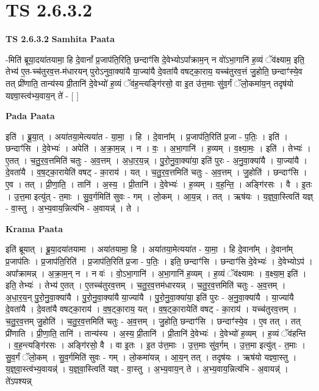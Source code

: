 \documentclass[17pt]{extarticle}
\begin{document}
\section*{ TS 2.6.3.2 }

\textbf{TS 2.6.3.2 } \newline
\textbf{Samhita Paata} \newline

-मिति॑ ब्रूया॒दया॑तयामा॒ हि दे॒वानां᳚ प्र॒जाप॑ति॒रिति॒ छन्दाꣳ॑सि दे॒वेभ्योऽपा᳚क्राम॒न् न वो॑ऽभा॒गानि॑ ह॒व्यं ॅव॑क्ष्याम॒ इति॒ तेभ्य॑ ए॒त-च्च॑तुरव॒त्त-म॑धारयन् पुरोऽनुवा॒क्या॑यै या॒ज्या॑यै दे॒वता॑यै वषट्का॒राय॒ यच्च॑तुरव॒त्तं जु॒होति॒ छन्दाꣳ॑स्ये॒व तत् प्री॑णाति॒ तान्य॑स्य प्री॒तानि॑ दे॒वेभ्यो॑ ह॒व्यं ॅव॑ह॒न्त्यङ्गि॑रसो॒ वा इ॒त उ॑त्त॒माः सु॑व॒र्गं ॅलो॒कमा॑य॒न् तदृष॑यो यज्ञ्वा॒स्त्व॑भ्य॒वाय॒न् ते॑ - [  ] \newline

\textbf{Pada Paata} \newline

इति॑ । ब्रू॒या॒त् । अया॑तया॒मेत्यया॑त - या॒मा॒ । हि । दे॒वाना᳚म् । प्र॒जाप॑ति॒रिति॑ प्र॒जा - प॒तिः॒ । इति॑ । छन्दाꣳ॑सि । दे॒वेभ्यः॑ । अपेति॑ । अ॒क्रा॒म॒न्न् । न । वः॒ । अ॒भा॒गानि॑ । ह॒व्यम् । व॒क्ष्या॒मः॒ । इति॑ । तेभ्यः॑ । ए॒तत् । च॒तु॒र॒व॒त्तमिति॑ चतुः - अ॒व॒त्तम् । अ॒धा॒र॒य॒न्न् । पु॒रो॒नु॒वा॒क्या॑या॒ इति॑ पुरः - अ॒नु॒वा॒क्या॑यै । या॒ज्या॑यै । दे॒वता॑यै । व॒ष॒ट्का॒रायेति॑ वषट् - का॒राय॑ । यत् । च॒तु॒र॒व॒त्तमिति॑ चतुः - अ॒व॒त्तम् । जु॒होति॑ । छन्दाꣳ॑सि । ए॒व । तत् । प्री॒णा॒ति॒ । तानि॑ । अ॒स्य॒ । प्री॒तानि॑ । दे॒वेभ्यः॑ । ह॒व्यम् । व॒ह॒न्ति॒ । अङ्गि॑रसः । वै । इ॒तः । उ॒त्त॒मा इत्यु॑त् - त॒माः । सु॒व॒र्गमिति॑ सुवः - गम् । लो॒कम् । आ॒य॒न्न् । तत् । ऋष॑यः । य॒ज्ञ्॒वा॒स्त्विति॑ यज्ञ् - वा॒स्तु । अ॒भ्य॒वाय॒न्नित्य॑भि - अ॒वायन्न्॑ । ते ।  \newline


\textbf{Krama Paata} \newline

इति॑ ब्रूयात् । ब्रू॒या॒दया॑तयामा । अया॑तयामा॒ हि । अया॑तया॒मेत्यया॑त - या॒मा॒ । हि दे॒वाना᳚म् । दे॒वाना᳚म् प्र॒जाप॑तिः । प्र॒जाप॑ति॒रिति॑ । प्र॒जाप॑ति॒रिति॑ प्र॒जा - प॒तिः॒ । इति॒ छन्दाꣳ॑सि । छन्दाꣳ॑सि दे॒वेभ्यः॑ । दे॒वेभ्योऽप॑ । अपा᳚क्रामन्न् । अ॒क्रा॒म॒न् न । न वः॑ । वो॒ऽभा॒गानि॑ । अ॒भा॒गानि॑ ह॒व्यम् । ह॒व्यं ॅव॑क्ष्यामः । व॒क्ष्या॒म॒ इति॑ । इति॒ तेभ्यः॑ । तेभ्य॑ ए॒तत् । ए॒तच्च॑तुरव॒त्तम् । च॒तु॒र॒व॒त्तम॑धारयन्न् । च॒तु॒र॒व॒त्तमिति॑ चतुः - अ॒व॒त्तम् । अ॒धा॒र॒य॒न् पु॒रो॒नु॒वा॒क्या॑यै । पु॒रो॒नु॒वा॒क्या॑यै या॒ज्या॑यै । पु॒रो॒नु॒वा॒क्या॑या॒ इति॑ पुरः - अ॒नु॒वा॒क्या॑यै । या॒ज्या॑यै दे॒वता॑यै । दे॒वता॑यै वषट्का॒राय॑ । व॒ष॒ट्का॒राय॒ यत् । व॒ष॒ट्का॒रायेति॑ वषट् - का॒राय॑ । यच्च॑तुरव॒त्तम् । च॒तु॒र॒व॒त्तम् जु॒होति॑ । च॒तु॒र॒व॒त्तमिति॑ चतुः - अ॒व॒त्तम् । जु॒होति॒ छन्दाꣳ॑सि । छन्दाꣳ॑स्ये॒व । ए॒व तत् । तत् प्री॑णाति । प्री॒णा॒ति॒ तानि॑ । तान्य॑स्य । अ॒स्य॒ प्री॒तानि॑ । प्री॒तानि॑ दे॒वेभ्यः॑ । दे॒वेभ्यो॑ ह॒व्यम् । ह॒व्यं ॅव॑हन्ति । व॒ह॒न्त्यङ्गि॑रसः । अङ्गि॑रसो॒ वै । वा इ॒तः । इ॒त उ॑त्त॒माः । उ॒त्त॒माः सु॑व॒र्गम् । उ॒त्त॒मा इत्यु॑त् - त॒माः । सु॒व॒र्गं ॅलो॒कम् । सु॒व॒र्गमिति॑ सुवः - गम् । लो॒कमा॑यन्न् । आ॒य॒न् तत् । तदृष॑यः । ऋष॑यो यज्ञ्वा॒स्तु । य॒ज्ञ्॒वा॒स्त्व॑भ्य॒वायन्न्॑ । य॒ज्ञ्॒वा॒स्त्विति॑ यज्ञ् - वा॒स्तु । अ॒भ्य॒वाय॒न् ते । अ॒भ्य॒वाय॒न्नित्य॑भि - अ॒वायन्न्॑ । ते॑ऽपश्यन्न् \newline
\end{document}
